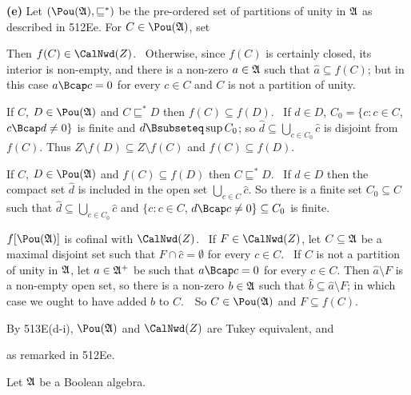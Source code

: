 {\medskip

{\bf (e)} Let $(\Pou(\frak A),\sqsubseteq^*)$
be the pre-ordered set of partitions of unity in $\frak A$ as described in
512Ee.   For $C\in\Pou(\frak A)$, set


\noindent Then $f(C)\in\CalNwd(Z)$.   \Prf\Quer\ Otherwise, since $f(C)$ is
certainly closed, its interior is non-empty, and there is a non-zero
$a\in\frak A$ such that $\widehat{a}\subseteq f(C)$;  but in this case
$a\Bcap c=0$ for every $c\in C$ and $C$ is not a partition of unity.\
\Bang\Qed

If $C$, $D\in\Pou(\frak A)$ and $C\sqsubseteq^*D$ then
$f(C)\subseteq f(D)$.
\Prf\ If $d\in D$, $C_0=\{c:c\in C$, $c\Bcap d\ne 0\}$ is finite and
$d\Bsubseteq\sup C_0$;  so
$\widehat{d}\subseteq\bigcup_{c\in C_0}\widehat{c}$ is disjoint from
$f(C)$.   Thus $Z\setminus f(D)\subseteq Z\setminus f(C)$ and
$f(C)\subseteq f(D)$.\ \Qed

If $C$, $D\in\Pou(\frak A)$ and $f(C)\subseteq f(D)$ then
$C\sqsubseteq^*D$.   \Prf\ If $d\in D$ then the compact set $\widehat{d}$
is included in the open set $\bigcup_{c\in C}\widehat{c}$.   So there is a
finite set $C_0\subseteq C$ such that
$\widehat{d}\subseteq\bigcup_{c\in C_0}\widehat{c}$ and
$\{c:c\in C$, $d\Bcap c\ne 0\}\subseteq C_0$ is finite.\ \Qed

$f[\Pou(\frak A)]$ is cofinal with $\CalNwd(Z)$.
\Prf\ If $F\in\CalNwd(Z)$, let
$C\subseteq\frak A$ be a maximal disjoint set such that
$F\cap\widehat{c}=\emptyset$ for every $c\in C$.   \Quer\ If $C$ is not a
partition of unity in $\frak A$, let $a\in\frak A^+$ be such that
$a\Bcap c=0$ for every $c\in C$.   Then $\widehat{a}\setminus F$ is a
non-empty open set, so there is a non-zero $b\in\frak A$ such that
$\widehat{b}\subseteq\widehat{a}\setminus F$;  in which case we ought to
have added $b$ to $C$.\ \BanG\  So $C\in\Pou(\frak A)$ and
$F\subseteq f(C)$.\ \Qed

By 513E(d-i), $\Pou(\frak A)$ and $\CalNwd(Z)$ are Tukey equivalent, and


\noindent as remarked in 512Ee.
}%

 Let $\frak A$ be a Boolean algebra.

